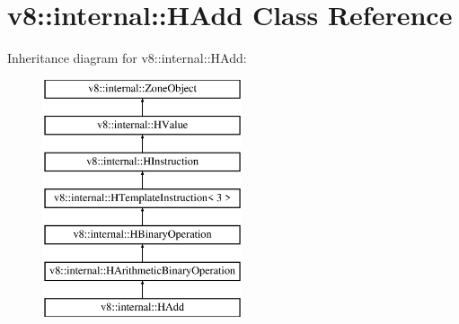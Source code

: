 \hypertarget{classv8_1_1internal_1_1_h_add}{}\section{v8\+:\+:internal\+:\+:H\+Add Class Reference}
\label{classv8_1_1internal_1_1_h_add}
Inheritance diagram for v8\+:\+:internal\+:\+:H\+Add\+:\begin{figure}[H]
\begin{center}
\leavevmode
\includegraphics[height=7.000000cm]{classv8_1_1internal_1_1_h_add}
\end{center}
\end{figure}
